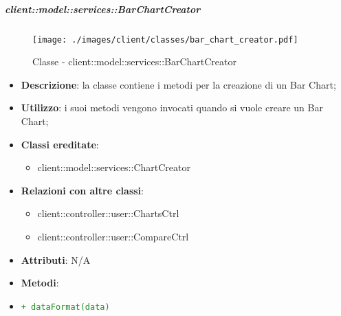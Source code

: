 		\subparagraph{client::model::services::BarChartCreator} %
		\label{subp:barchartcreator}
			\begin{figure}[htbp]
				\centering
				\centerline{\texttt{[image: ./images/client/classes/bar\_chart\_creator.pdf]}}
				\caption{Classe - client::model::services::BarChartCreator}
			\end{figure}
			\begin{itemize}
				\item \textbf{Descrizione}: la classe contiene i metodi per la creazione di un Bar Chart;
				\item \textbf{Utilizzo}: i suoi metodi vengono invocati quando si vuole creare un Bar Chart;
				\item \textbf{Classi ereditate}:
					\begin{itemize}
						\item client::model::services::ChartCreator
					\end{itemize}
				\item \textbf{Relazioni con altre classi}:
					\begin{itemize}
						\item client::controller::user::ChartsCtrl
						\item client::controller::user::CompareCtrl
					\end{itemize}
				\item \textbf{Attributi}: N/A
				\item \textbf{Metodi}: 
					\item \textcolor{forestgreen}{\texttt{+ dataFormat(data)}}
			\end{itemize}


